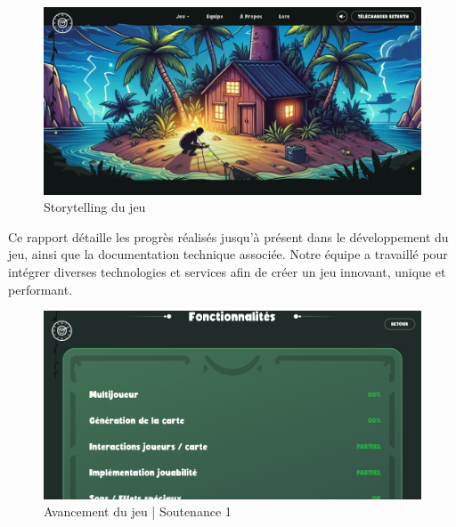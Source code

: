 \documentclass[
	article,			%
	11pt,				%
	oneside,			%
	a4paper,			%
	chapter=TITLE,
	french,			%
	sumario=tradicional
	]{base_nt}
\begin{document}

\frenchspacing 


%
%
\maketitle

\newpage
\vspace{0cm}
\begin{figure}[ht]
	\caption{Storytelling du jeu}
	\centering
	\includegraphics[width=1\linewidth]{paper1.png}
	
\end{figure}

Ce rapport détaille les progrès réalisés jusqu'à présent dans le développement du jeu, ainsi que la documentation technique associée. Notre équipe a travaillé pour intégrer diverses technologies et services afin de créer un jeu innovant, unique et performant.

\vspace{0cm}
\begin{figure}[ht]
	\caption{Avancement du jeu | Soutenance 1}
	\centering
	\includegraphics[width=1\linewidth]{paper2.png}
	
\end{figure}
\end{document}
